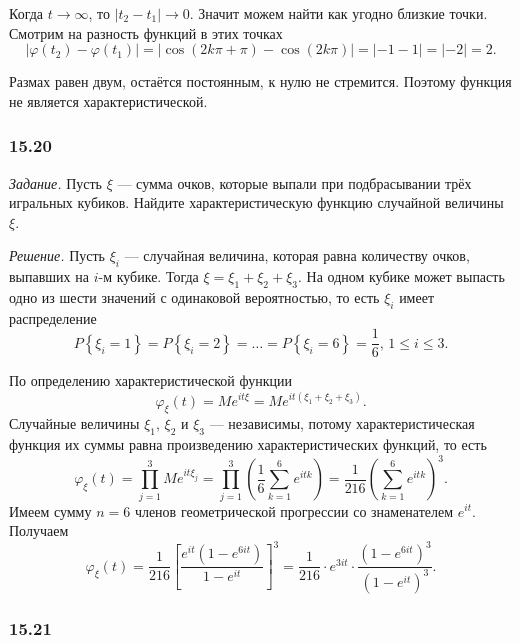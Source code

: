 \begin{enumerate}[label=\alph*)]
Когда $t \rightarrow \infty $, то $ \left| t_2 - t_1 \right| \rightarrow 0$.
Значит можем найти как угодно близкие точки.
Смотрим на разность функций в этих точках
$$ \left| \varphi \left( t_2 \right) - \varphi \left( t_1 \right) \right| =
  \left| \cos \left( 2k \pi + \pi \right) - \cos \left( 2k \pi \right) \right| =
  \left| - 1 - 1 \right| =
  \left| - 2 \right| =
  2.$$

Размах равен двум, остаётся постоянным, к нулю не стремится.
Поэтому функция не является характеристической.
\end{enumerate}

\subsubsection*{15.20}

\textit{Задание.}
Пусть $ \xi $ --- сумма очков, которые выпали при подбрасывании трёх игральных кубиков.
Найдите характеристическую функцию случайной величины $ \xi $.

\textit{Решение.}
Пусть $ \xi_i$ --- случайная величина, которая равна количеству очков, выпавших на $i$-м кубике.
Тогда $ \xi = \xi_1 + \xi_2 + \xi_3$.
На одном кубике может выпасть одно из шести значений с одинаковой вероятностью,
то есть $ \xi_i$ имеет распределение
$$P \left\{ \xi_i = 1 \right\} =
  P \left\{ \xi_i = 2 \right\} =
  \dotsc =
  P \left\{ \xi_i = 6 \right\} =
  \frac{1}{6}, \,
  1 \leq i \leq 3.$$

По определению характеристической функции
$$ \varphi_{ \xi } \left( t \right) =
  Me^{it \xi} =
  Me^{it \left( \xi_1 + \xi_2 + \xi_3 \right) }.$$
Случайные величины $ \xi_1, \, \xi_2$ и $ \xi_3$ --- независимы,
потому характеристическая функция их суммы равна произведению характеристических функций, то есть
$$ \varphi_{ \xi } \left( t \right) =
  \prod \limits_{j = 1}^3 Me^{it \xi_j} =
  \prod \limits_{j = 1}^3 \left( \frac{1}{6} \sum \limits_{k = 1}^6 e^{itk} \right) =
  \frac{1}{216} \left( \sum \limits_{k=1}^6 e^{itk} \right)^3.$$
Имеем сумму $n = 6$ членов геометрической прогрессии со знаменателем $e^{it}$.
Получаем
$$ \varphi_{ \xi } \left( t \right) =
  \frac{1}{216} \left[ \frac{e^{it} \left( 1 - e^{6it} \right) }{ 1 - e^{it}} \right]^3 =
  \frac{1}{216} \cdot e^{3it} \cdot
  \frac{ \left( 1 - e^{6it} \right)^3}{ \left( 1 - e^{it} \right)^3}.$$

\subsubsection*{15.21}

